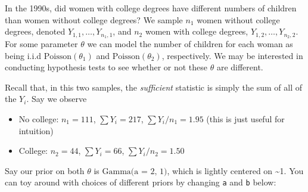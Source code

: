 \documentclass[
]{article}
\providecommand{\tightlist}{%
  \setlength{\itemsep}{0pt}\setlength{\parskip}{0pt}}
\begin{document}
In the 1990s, did women with college degrees have different numbers of
children than women without college degrees? We sample \(n_1\) women
without college degrees, denoted \(Y_{1,1}, \dots, Y_{n_1, 1}\), and
\(n_2\) women with college degrees, \(Y_{1, 2}, \dots, Y_{n_2, 2}\). For
some parameter \(\theta\) we can model the number of children for each
woman as being i.i.d \(\text{Poisson}(\theta_1)\) and
\(\text{Poisson}(\theta_2)\), respectively. We may be interested in
conducting hypothesis tests to see whether or not these \(\theta\) are
different.

Recall that, in this two samples, the \emph{sufficient} statistic is
simply the sum of all of the \(Y_i\). Say we observe

\begin{itemize}
\tightlist
\item
  No college: \(n_1 = 111\), \(\sum Y_i = 217\),
  \(\sum Y_i / n_1 = 1.95\) (this is just useful for intuition)
\item
  College: \(n_2 = 44\), \(\sum Y_i = 66\), \(\sum Y_i / n_2 = 1.50\)
\end{itemize}

Say our prior on both \(\theta\) is \(\text{Gamma(a = 2, 1)}\), which is
lightly centered on \textasciitilde1. You can toy around with choices of
different priors by changing \texttt{a} and \texttt{b} below:
\end{document}
